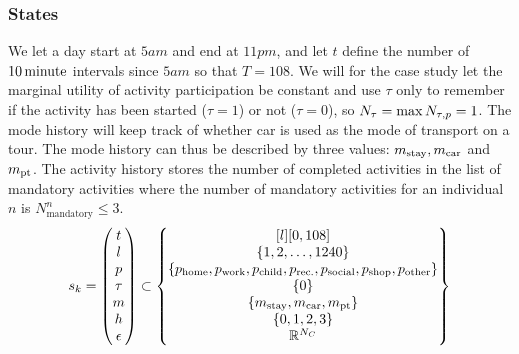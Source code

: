 \subsubsection{States}
We let a day start at $5\unit{am}$ and end at $11\unit{pm}$, and let $t$ define the number of $10\, \mathrm{minute}$ intervals since $5\unit{am}$ so that $T=108$.
We will for the case study let the marginal utility of activity participation be constant and use $\tau$ only to remember if the activity has been started ($\tau=1$) or not ($\tau=0$), so $N_\tau=\max{N_{\tau,p}}=1$. The mode history will keep track of whether car is used as the mode of transport on a tour. The mode history can thus be described by three values: $m_{\text{stay}},m_{\text{car}}$ and $m_{\text{pt}}$. The activity history stores the number of completed activities in the list of mandatory activities where the number of mandatory activities for an individual $n$ is $N^n_\text{mandatory}\leq 3$. 
\begin{equation}
\s{k} = \begin{pmatrix}
t \\
l \\
p \\
\atime\\
m \\
\amem \\
\epsilon
\end{pmatrix}
\subset
\begin{Bmatrix*}[l]
[0,108] \\
\{1,2,\dots, 1240\} \\
\{ \p{home},\p{work},\p{child},\p{rec.},\p{social},\p{shop},\p{other}\}  \\
\{0\} \\
\{m_{\text{stay}},\m{car},\m{pt} \}\\
\{0,1,2,3\}\\
\rr^{N_C}
\end{Bmatrix*}
\end{equation}

